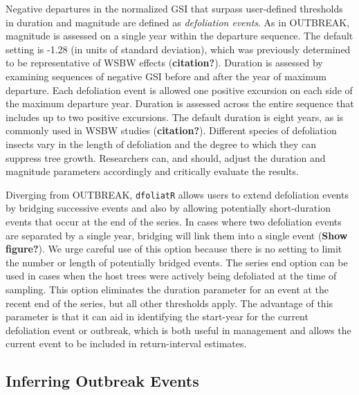 \documentclass[review]{elsarticle} %
\begin{document}
Negative departures in the normalized GSI that surpass user-defined
thresholds in duration and magnitude are defined as \emph{defoliation
events}. As in OUTBREAK, magnitude is assessed on a single year within
the departure sequence. The default setting is -1.28 (in units of
standard deviation), which was previously determined to be
representative of WSBW effects (\textbf{citation?}). Duration is
assessed by examining sequences of negative GSI before and after the
year of maximum departure. Each defoliation event is allowed one
positive excursion on each side of the maximum departure year. Duration
is assessed across the entire sequence that includes up to two positive
excursions. The default duration is eight years, as is commonly used in
WSBW studies (\textbf{citation?}). Different species of defoliation
insects vary in the length of defoliation and the degree to which they
can suppress tree growth. Researchers can, and should, adjust the
duration and magnitude parameters accordingly and critically evaluate
the results.

Diverging from OUTBREAK, \texttt{dfoliatR} allows users to extend
defoliation events by bridging successive events and also by allowing
potentially short-duration events that occur at the end of the series.
In cases where two defoliation events are separated by a single year,
bridging will link them into a single event (\textbf{Show figure?}). We
urge careful use of this option because there is no setting to limit the
number or length of potentially bridged events. The series end option
can be used in cases when the host trees were actively being defoliated
at the time of sampling. This option eliminates the duration parameter
for an event at the recent end of the series, but all other thresholds
apply. The advantage of this parameter is that it can aid in identifying
the start-year for the current defoliation event or outbreak, which is
both useful in management and allows the current event to be included in
return-interval estimates.

\hypertarget{inferring-outbreak-events}{%
\subsection{Inferring Outbreak Events}\label{inferring-outbreak-events}}
\end{document}
